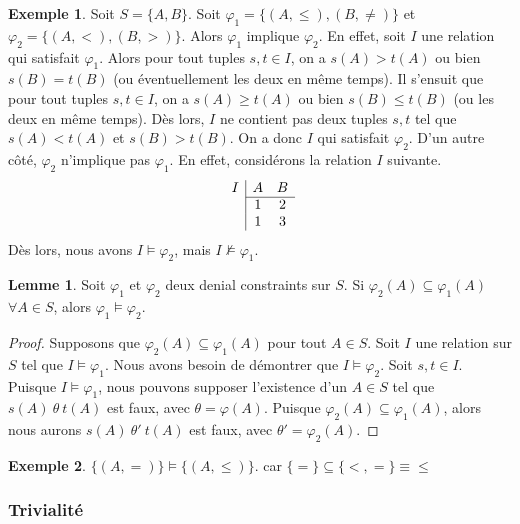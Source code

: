 \documentclass[letterpaper, 12pt]{report}
\theoremstyle{definition}
\newtheorem{mylemma}{Lemme}
\newtheorem{myexample}{Exemple}
\begin{document}
\begin{myexample}
Soit $S=\{A,B\}$.
Soit $\varphi_1=\{(A,\leq),(B,\neq)\}$ et $\varphi_2=\{(A,<),(B,>)\}$.
Alors $\varphi_1$ implique $\varphi_2$.
En effet, soit $I$ une relation qui satisfait $\varphi_1$.
Alors pour tout tuples $s,t\in I$, on a $s(A)>t(A)$ ou bien $s(B)=t(B)$ (ou éventuellement les deux en même temps).
Il s'ensuit que pour tout tuples $s,t\in I$, on a $s(A)\geq t(A)$ ou bien $s(B)\leq t(B)$ (ou les deux en même temps).
Dès lors, $I$ ne contient pas deux tuples $s,t$ tel que  $s(A)<t(A)$ et $s(B)>t(B)$.
On a donc $I$ qui satisfait $\varphi_2$.
D'un autre côté, $\varphi_2$ n'implique pas $\varphi_1$.
En effet, considérons la relation $I$ suivante.
$$
\begin{array}{c|cc}
I & A & B\\\cline{2-3}
  & 1 & 2\\
  & 1 & 3
\end{array}  
$$
Dès lors, nous avons $I\models\varphi_2$, mais $I\not\models\varphi_1$.
\end{myexample}

\begin{mylemma}\label{lem:characterization}
Soit $\varphi_1$ et $\varphi_2$ deux denial constraints sur $S$.
Si $\varphi_2(A)\subseteq\varphi_1(A)$ $\forall A\in S$, alors $\varphi_1\models\varphi_2$.
\end{mylemma}
\begin{proof}
Supposons que $\varphi_2(A)\subseteq\varphi_1(A)$ pour tout $A\in S$.
Soit $I$ une relation sur $S$ tel que $I\models\varphi_1$.
Nous avons besoin de démontrer que $I\models\varphi_2$.
Soit $s,t\in I$.
Puisque $I\models\varphi_1$, nous pouvons supposer l'existence d'un $A\in S$ tel que $s(A)\ \theta\ t(A)$ est faux, avec $\theta=\varphi(A)$. 
Puisque $\varphi_2(A)\subseteq\varphi_1(A)$,
alors nous aurons $s(A)\ \theta'\ t(A)$ est faux, avec $\theta'=\varphi_2(A)$.
\end{proof}

\begin{myexample}
 $\{(A,=)\}\models\{(A,\leq)\}$. car $\{=\} \subseteq \{<,=\} \equiv \leq$
\end{myexample}

\subsubsection{Trivialité}
\end{document}
